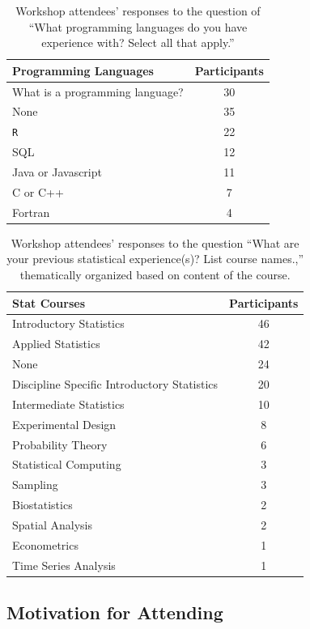 \documentclass[12pt]{article}
\begin{document}
{
\begin{table}[h!]
    \centering
    \begin{tabular}{lc}
\hline
Programming Languages & Participants \\
\hline
What is a programming language? & 30 \\
None & 35 \\
\texttt{R} & 22 \\
SQL & 12 \\
Java or Javascript & 11 \\
C or C++ & 7 \\
Fortran & 4 \\
\hline
\end{tabular}
\caption{Workshop attendees' responses to the question of ``What programming
languages do you have experience with? Select all that apply.''}
    \label{tab:programming}
\end{table}
}

{
\begin{table}[h!]
    \centering
    \begin{tabular}{lc}
\hline
Stat Courses & Participants \\
\hline
Introductory Statistics & 46 \\
Applied Statistics & 42 \\
None & 24 \\
Discipline Specific Introductory Statistics & 20 \\
Intermediate Statistics & 10 \\
Experimental Design	& 8 \\
Probability Theory	& 6 \\
Statistical Computing & 3 \\
Sampling & 3 \\
Biostatistics & 2 \\
Spatial Analysis & 2 \\
Econometrics & 1 \\
Time Series Analysis & 1 \\
\hline
\end{tabular}
\caption{Workshop attendees' responses to the question ``What are your previous
statistical experience(s)?  List course names.,'' thematically organized based
on content of the course.}
\label{tab:statistics}
\end{table}
}

\subsection{Motivation for Attending} 
\end{document}
